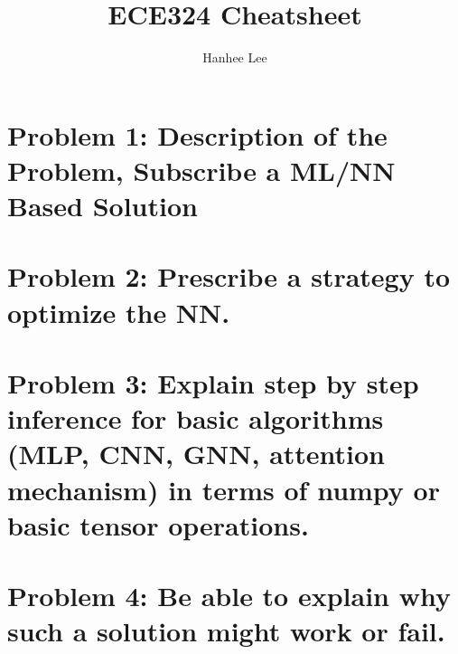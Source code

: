 \documentclass{article}
\title{ECE324 Cheatsheet}
\author{Hanhee Lee}
\begin{document}
\section{Problem 1: Description of the Problem, Subscribe a ML/NN Based Solution}
\begin{process}

\end{process}

\begin{definition}
    
\end{definition}

\begin{example}
    
\end{example}

\section{Problem 2: Prescribe a strategy to optimize the NN.}
\begin{process}

\end{process}

\begin{definition}
    
\end{definition}

\begin{example}
    
\end{example}

\section{Problem 3: Explain step by step inference for basic algorithms (MLP, CNN, GNN, attention mechanism) in terms of numpy or basic tensor operations.}
\begin{process}

\end{process}

\begin{definition}
    
\end{definition}

\begin{example}
    
\end{example}

\section{Problem 4: Be able to explain why such a solution might work or fail.} 
\begin{process}

\end{process}
\end{document}

